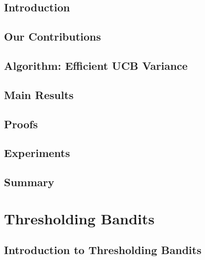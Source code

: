 \documentclass[MS,twoside]{iitmdiss}
\newcommand{\clearemptydoublepage}{\newpage{\cleardoublepage}}
\begin{document}
\section{Introduction}
\label{Chapter3:intro}



\section{Our Contributions}
\label{sec:contri}


\section{Algorithm: Efficient UCB Variance}
\label{sec:eucbv}


\section{Main Results} 
\label{sec:results}


\section{Proofs}
\label{sec:proofTheorem}


\section{Experiments}
\label{sec:expt}


\section{Summary}
\label{sec:conc}











\clearemptydoublepage
\chapter{Thresholding Bandits}
\label{chap:tbandit1}

\section{Introduction to Thresholding Bandits}
\label{tbandit:intro1}

\end{document}
